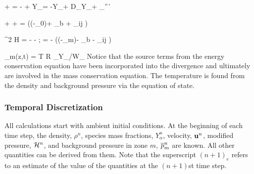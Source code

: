 \documentclass[11pt]{book}
\begin{document}
\be {} + \bu \cdot \nabla \rho
       =  -\rho \nabla \cdot \bu  \label{mass2} \ee
{}
\be {} + \bu \cdot \nabla \rho Y_\alpha  =
-\rho Y_\alpha \nabla \cdot \bu + \nabla \cdot \rho D_\alpha \nabla Y_\alpha + \dm_\alpha'''
  \label{species2} \ee

\be {} + \bu \times \bo +  =
   \left((\rho-\rho_0)\bg + {\bof_b}
  + \nabla \cdot \btau_{ij} \right) \label{momentum2} \ee

\be \nabla^2 {\cal H} = - - \nabla \cdot \bF  \quad ; \quad
\bF = \bu \times \bo -  \left((\rho-\rho_m)\bg - {\bof_b} - \nabla \cdot \btau_{ij} \right)   \label{simplephi2} \ee

\be \bp_m(z,t) = \rho T {\cal R} \sum_\alpha  Y_\alpha/W_\alpha \ee
Notice that the source terms from the energy conservation equation have
been incorporated into the divergence and ultimately are involved in
the mass conservation equation. The temperature is found from the
density and background pressure via the equation of state.

\subsubsection{Temporal Discretization}

All calculations start with ambient initial conditions.
At the beginning of each time step, the density,
$\rho^n$, species mass fractions, $Y_\alpha^n$, velocity, ${\bf u}^n$, modified pressure, ${\cal H}^n$, and background
pressure in zone $m$, $\overline{p}_m^n$ are known. All
other quantities can be derived from them.
Note that the superscript $(n+1)_e$ refers to an estimate of the value
of the quantities at the $(n+1)$st time step.
\end{document}
